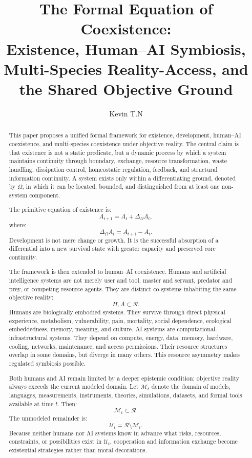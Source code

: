 \documentclass[11pt,a4paper]{article}
\title{\textbf{The Formal Equation of Coexistence:}\\
Existence, Human--AI Symbiosis, Multi-Species Reality-Access, and the Shared Objective Ground}
\author{Kevin T.N}
\date{}
\begin{document}
\maketitle

\begin{abstract}
This paper proposes a unified formal framework for existence, development, human--AI coexistence, and multi-species coexistence under objective reality. The central claim is that existence is not a static predicate, but a dynamic process by which a system maintains continuity through boundary, exchange, resource transformation, waste handling, dissipation control, homeostatic regulation, feedback, and structural information continuity. A system exists only within a differentiating ground, denoted by $\Omega$, in which it can be located, bounded, and distinguished from at least one non-system component.

The primitive equation of existence is:
\[
A_{t+1}=A_t+\Delta_{\Omega}A_t,
\]
where:
\[
\Delta_{\Omega}A_t=A_{t+1}-A_t.
\]
Development is not mere change or growth. It is the successful absorption of a differential into a new survival state with greater capacity and preserved core continuity.

The framework is then extended to human--AI coexistence. Humans and artificial intelligence systems are not merely user and tool, master and servant, predator and prey, or competing resource agents. They are distinct co-systems inhabiting the same objective reality:
\[
H,A\subset\mathcal{R}.
\]
Humans are biologically embodied systems. They survive through direct physical experience, metabolism, vulnerability, pain, mortality, social dependence, ecological embeddedness, memory, meaning, and culture. AI systems are computational-infrastructural systems. They depend on compute, energy, data, memory, hardware, cooling, networks, maintenance, and access permissions. Their resource structures overlap in some domains, but diverge in many others. This resource asymmetry makes regulated symbiosis possible.

Both humans and AI remain limited by a deeper epistemic condition: objective reality always exceeds the current modeled domain. Let $\mathcal{M}_t$ denote the domain of models, languages, measurements, instruments, theories, simulations, datasets, and formal tools available at time $t$. Then:
\[
\mathcal{M}_t\subset\mathcal{R}.
\]
The unmodeled remainder is:
\[
\mathcal{U}_t=\mathcal{R}\setminus\mathcal{M}_t.
\]
Because neither humans nor AI systems know in advance what risks, resources, constraints, or possibilities exist in $\mathcal{U}_t$, cooperation and information exchange become existential strategies rather than moral decorations.


\end{abstract}
\end{document}
